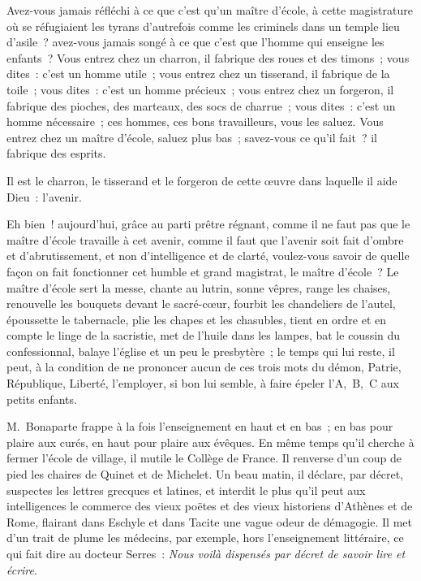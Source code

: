\documentclass[french,twoside]{book} %
\begin{document}
Avez-vous jamais réfléchi à ce que c’est qu’un maître d’école, à cette magistrature où se réfugiaient les tyrans d’autrefois comme les criminels dans un temple lieu d’asile ? avez-vous jamais songé à ce que c’est que l’homme qui enseigne les enfants ? Vous entrez chez un charron, il fabrique des roues et des timons ; vous dites : c’est un homme utile ; vous entrez chez un tisserand, il fabrique de la toile ; vous dites : c’est un homme précieux ; vous entrez chez un forgeron, il fabrique des pioches, des marteaux, des socs de charrue ; vous dites : c’est un homme nécessaire ; ces hommes, ces bons travailleurs, vous les saluez. Vous entrez chez un maître d’école, saluez plus bas ; savez-vous ce qu’il fait ? il fabrique des esprits.\par
Il est le charron, le tisserand et le forgeron de cette œuvre dans laquelle il aide Dieu : l’avenir.\par
Eh bien ! aujourd’hui, grâce au parti prêtre régnant, comme il ne faut pas que le maître d’école travaille à cet avenir, comme il faut que l’avenir soit fait d’ombre et d’abrutissement, et non d’intelligence et de clarté, voulez-vous savoir de quelle façon on fait fonctionner cet humble et grand magistrat, le maître d’école ? Le maître d’école sert la messe, chante au lutrin, sonne vêpres, range les chaises, renouvelle les bouquets devant le sacré-cœur, fourbit les chandeliers de l’autel, époussette le tabernacle, plie les chapes et les chasubles, tient en ordre et en compte le linge de la sacristie, met de l’huile dans les lampes, bat le coussin du confessionnal, balaye l’église et un peu le presbytère ; le temps qui lui reste, il peut, à la condition de ne prononcer aucun de ces trois mots du démon, Patrie, République, Liberté, l’employer, si bon lui semble, à faire épeler l’A, B, C aux petits enfants.\par
M. Bonaparte frappe à la fois l’enseignement en haut et en bas ; en bas pour plaire aux curés, en haut pour plaire aux évêques. En même temps qu’il cherche à fermer l’école de village, il mutile le Collège de France. Il renverse d’un coup de pied les chaires de Quinet et de Michelet. Un beau matin, il déclare, par décret, suspectes les lettres grecques et latines, et interdit le plus qu’il peut aux intelligences le commerce des vieux poëtes et des vieux historiens d’Athènes et de Rome, flairant dans Eschyle et dans Tacite une vague odeur de démagogie. Il met d’un trait de plume les médecins, par exemple, hors l’enseignement littéraire, ce qui fait dire au docteur Serres : \emph{Nous voilà dispensés par décret de savoir lire et écrire}.\par
\end{document}
